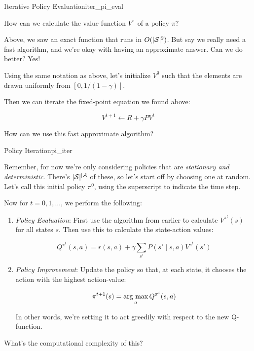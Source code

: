 \documentclass[../main/main]{subfiles}
\begin{document}
\begin{theorem}{Iterative Policy Evaluation}{iter_pi_eval}

How can we calculate the value function $V^\pi$ of a policy $\pi$?

Above, we saw an exact function that runs in $O(|\S|^2)$.
But say we really need a fast algorithm, and we're okay with having an
approximate answer. Can we do better? Yes!

Using the same notation as above,
let's initialize $V^0$ such that the elements are drawn uniformly
from $[0, 1/(1-\gamma)]$.

Then we can iterate the fixed-point equation we found above:

\[ V^{t+1} \gets R + \gamma P V^t \]


\end{theorem}


How can we use this fast approximate algorithm?

\begin{theorem}{Policy Iteration}{pi_iter}

Remember, for now we're only considering policies that are
\emph{stationary and deterministic}. There's $|\S|^{|\A}$ of these, so let's
start off by choosing one at random. Let's call this initial policy $\pi^0$,
using the superscript to indicate the time step.

Now for $t = 0, 1, \dots$, we perform the following:

\begin{enumerate}
    
\item \emph{Policy Evaluation}: First use the algorithm from earlier to
    calculate $V^{\pi^t}(s)$ for all states $s$. Then use this to calculate the
    state-action values:

    \[
        Q^{\pi^t}(s, a) = r(s, a) + \gamma \sum_{s'} P(s' \mid s, a) V^{\pi^t} (s')
    \]

\item \emph{Policy Improvement}: Update the policy so that, at each state,
    it chooses the action with the highest action-value:

    \[
        \pi^{t+1}(s) = \argmax_a Q^{\pi^t} (s, a)
    \]

    In other words, we're setting it to act greedily with respect to the new Q-function.

\end{enumerate}

What's the computational complexity of this?


\end{theorem}
\end{document}
